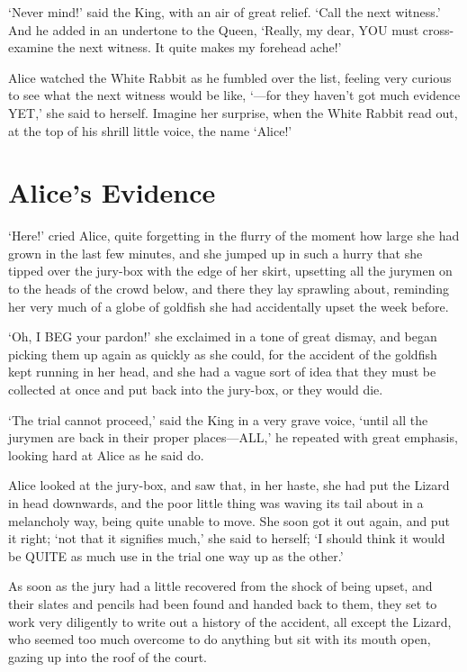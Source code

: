 \documentclass[12pt]{article}
\begin{document}
\begin{Parallel}[p]{}{}
{‘Never mind!’ said the King, with an air of great relief. ‘Call the next witness.’ And he added in an undertone to the Queen, ‘Really, my dear, YOU must cross-examine the next witness. It quite makes my forehead ache!’

Alice watched the White Rabbit as he fumbled over the list, feeling very curious to see what the next witness would be like, ‘—for they haven’t got much evidence YET,’ she said to herself. Imagine her surprise, when the White Rabbit read out, at the top of his shrill little voice, the name ‘Alice!’




\section{Alice’s Evidence}


‘Here!’ cried Alice, quite forgetting in the flurry of the moment how large she had grown in the last few minutes, and she jumped up in such a hurry that she tipped over the jury-box with the edge of her skirt, upsetting all the jurymen on to the heads of the crowd below, and there they lay sprawling about, reminding her very much of a globe of goldfish she had accidentally upset the week before.

‘Oh, I BEG your pardon!’ she exclaimed in a tone of great dismay, and began picking them up again as quickly as she could, for the accident of the goldfish kept running in her head, and she had a vague sort of idea that they must be collected at once and put back into the jury-box, or they would die.

‘The trial cannot proceed,’ said the King in a very grave voice, ‘until all the jurymen are back in their proper places—ALL,’ he repeated with great emphasis, looking hard at Alice as he said do.

Alice looked at the jury-box, and saw that, in her haste, she had put the Lizard in head downwards, and the poor little thing was waving its tail about in a melancholy way, being quite unable to move. She soon got it out again, and put it right; ‘not that it signifies much,’ she said to herself; ‘I should think it would be QUITE as much use in the trial one way up as the other.’

As soon as the jury had a little recovered from the shock of being upset, and their slates and pencils had been found and handed back to them, they set to work very diligently to write out a history of the accident, all except the Lizard, who seemed too much overcome to do anything but sit with its mouth open, gazing up into the roof of the court.

}
\end{Parallel}
\end{document}
